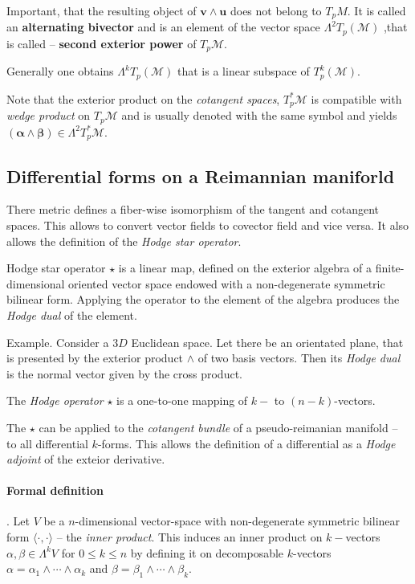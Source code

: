 {    Important, that the resulting object of $\boldsymbol{v}\wedge\boldsymbol{u}$ does not belong to $T_p M$. It is called an \textbf{alternating bivector} and is an element of the vector space $\Lambda^2 T_p (\mathcal{M})$ ,that is called -- \textbf{second exterior power} of $T_p \mathcal{M}$.
    
    Generally one obtains $\Lambda^k T_p (\mathcal{M})$ that is a linear subspace of $T_p ^k (\mathcal{M})$.
    
    Note that the exterior product on the \textit{cotangent spaces}, $T_p ^* \mathcal{M}$ is compatible with \textit{wedge product} on $T_p\mathcal{M}$ and is usually denoted with the same symbol and yields
    $(\boldsymbol{\alpha}\wedge\boldsymbol{\beta})\in\Lambda^2 T_p ^* \mathcal{M}$.
    
    
    \subsection{Differential forms on a Reimannian maniforld}
    
    There metric defines a fiber-wise isomorphism of the tangent and cotangent spaces. This allows to convert vector fields to covector field and vice versa. It also allows the definition of the \textit{Hodge star operator}.
    
    Hodge star operator $\star$ is a linear map, defined on the exterior algebra of a finite-dimensional oriented vector space endowed with a non-degenerate symmetric bilinear form. Applying the operator to the element of the algebra produces the \textit{Hodge dual} of the element.
    
    Example. Consider a $3D$ Euclidean space. Let there be an orientated plane, that is presented by the exterior product $\wedge$ of two basis vectors. Then its \textit{Hodge dual} is the normal vector given by the cross product. 
    
    The \textit{Hodge operator} $\star$ is a one-to-one mapping of $k-$ to $(n-k)$-vectors.
    
    The $\star$ can be applied to the \textit{cotangent bundle} of a pseudo-reimanian manifold -- to all differential $k$-forms. This allows the definition of a differential as a \textit{Hodge adjoint} of the exteior derivative. 
    
    \paragraph{Formal definition}. Let $V$ be a $n$-dimensional vector-space with non-degenerate symmetric bilinear form $\langle\cdot,\cdot\rangle$ -- the \textit{inner product}. 
    This induces an inner product on $k-$vectors $\alpha,\beta\in\Lambda^k V$ for $0\leq k \leq n$ by defining it on decomposable $k$-vectors $\alpha = \alpha_1\wedge\cdots\wedge\alpha_k$ and $\beta=\beta_1\wedge\cdots\wedge\beta_k$.
    
}
